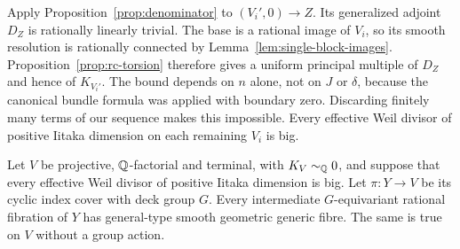 Apply Proposition~\ref{prop:denominator} to $(V_i',0)\to Z$.
Its generalized adjoint $D_Z$ is rationally linearly trivial.  The
base is a rational image of $V_i$, so its smooth resolution is
rationally connected by Lemma~\ref{lem:single-block-images}.
Proposition~\ref{prop:rc-torsion} therefore gives a uniform principal
multiple of $D_Z$ and hence of $K_{V_i'}$.  The bound depends on
$n$ alone, not on $J$ or $\delta$, because the canonical bundle
formula was applied with boundary zero.  Discarding finitely many
terms of our sequence makes this impossible.  Every effective Weil
divisor of positive Iitaka dimension on each remaining $V_i$ is big.

\begin{lemma}
\label{lem:general-type-fibres}
Let $V$ be projective, $\mathbb Q$-factorial and terminal, with
$K_V\sim_{\mathbb Q}0$, and suppose that every effective Weil divisor of
positive Iitaka dimension is big.  Let $\pi:Y\to V$ be its cyclic
index cover with deck group $G$.  Every intermediate
$G$-equivariant rational fibration of $Y$ has general-type smooth
geometric generic fibre.  The same is true on $V$ without a group
action.
\end{lemma}

